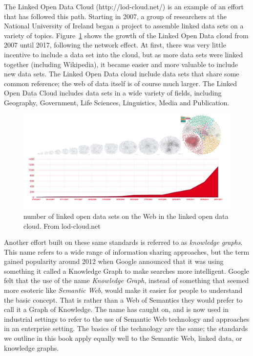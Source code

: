 The Linked Open Data Cloud (http://lod-cloud.net/) is an example of an
effort that has followed this path. Starting in 2007, a group of
researchers at the National University of Ireland began a project to
assemble linked data sets on a variety of topics. Figure~\ref{fig:ch1.1} shows the
growth of the Linked Open Data cloud from 2007 until 2017, following the
network effect. At first, there was very little incentive to include a
data set into the cloud, but as more data sets were linked together
(including Wikipedia), it became easier and more valuable to include new
data sets. The Linked Open Data cloud include data sets that share some
common reference; the web of data itself is of course much larger. The
Linked Open Data Cloud includes data sets in a wide variety of fields,
including Geography, Government, Life Sciences, Linguistics, Media and
Publication.

\begin{figure}
    \centering
    \includegraphics[width=5.0in]{media/image1.png}
    \caption{number of linked open data sets on the Web in the linked open
data cloud.  From lod-cloud.net}
    \label{fig:ch1.1}
\end{figure}


Another effort built on these same standards is referred to as \emph{knowledge graphs}. 
This name refers to a wide range of information sharing approaches, but 
the term gained popularity around 2012 when Google announced that it was 
using something it called a Knowledge Graph to make searches more intelligent. 
Google felt that the use of the name \emph{Knowledge Graph}, instead of 
something that seemed more esoteric like \emph{Semantic Web}, 
would make it easier for people to understand the 
basic concept.  That is rather than a Web of Semantics they would prefer to 
call it a Graph of Knowledge.   The name has caught on, and is now used 
in industrial settings to refer to the use of Semantic Web technology and approaches
in an enterprise setting.  The basics of the technology are the same; the
standards we outline in this book apply equally well to the Semantic Web, linked data, or knowledge graphs.


